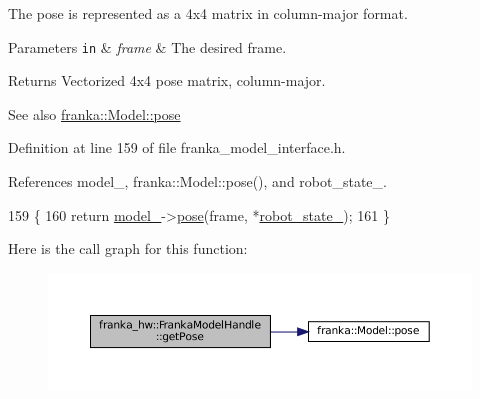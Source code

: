 The pose is represented as a 4x4 matrix in column-\/major format.


\begin{DoxyParams}[1]{Parameters}
\mbox{\tt in}  & {\em frame} & The desired frame.\\
\hline
\end{DoxyParams}
\begin{DoxyReturn}{Returns}
Vectorized 4x4 pose matrix, column-\/major.
\end{DoxyReturn}
\begin{DoxySeeAlso}{See also}
\hyperlink{classfranka_1_1Model_adcd68a474d3843e5d9699c0f37fc76e8}{franka\+::\+Model\+::pose} 
\end{DoxySeeAlso}


Definition at line 159 of file franka\+\_\+model\+\_\+interface.\+h.



References model\+\_\+, franka\+::\+Model\+::pose(), and robot\+\_\+state\+\_\+.


\begin{DoxyCode}
159                                                                \{
160     \textcolor{keywordflow}{return} \hyperlink{classfranka__hw_1_1FrankaModelHandle_a0c47e6c735f1bd809581b0498d53349b}{model\_}->\hyperlink{classfranka_1_1Model_adcd68a474d3843e5d9699c0f37fc76e8}{pose}(frame, *\hyperlink{classfranka__hw_1_1FrankaModelHandle_a16192f263ce4709d99f557c6d8fabeb1}{robot\_state\_});
161   \}
\end{DoxyCode}
Here is the call graph for this function\+:
\nopagebreak
\begin{figure}[H]
\begin{center}
\leavevmode
\includegraphics[width=350pt]{classfranka__hw_1_1FrankaModelHandle_af6617a4a3a89908c4a0aa8d25b2bfc07_cgraph}
\end{center}
\end{figure}
\mbox{\label{classfranka__hw_1_1FrankaModelHandle_aa5f4161223cf728ad3ca1bf48768df50}} 

